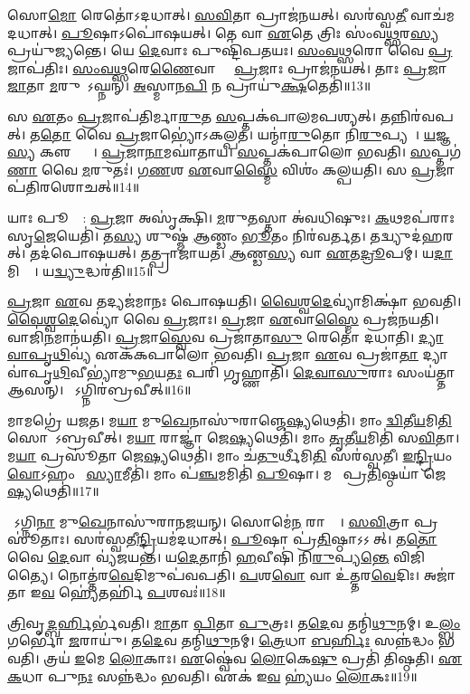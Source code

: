 𑌸𑍋\ul{𑌮𑍋} 𑌰𑍇𑌤𑍋॑\-𑌽𑌦𑌧𑌾𑌤𑍍।
\ul{𑌸}\ul{𑌵𑌿}𑌤𑌾 𑌪𑍍𑌰𑌾𑌜॑𑌨𑌯𑌤𑍍।
𑌸𑌰॑𑌸𑍍𑌵\ul{𑌤𑍀} 𑌵𑌾𑌚॑𑌮𑌦𑌧𑌾𑌤𑍍।
\ul{𑌪𑍂}𑌷𑌾\-𑌽𑌪𑍋॑𑌷𑌯𑌤𑍍।
𑌤𑍇 𑌵𑌾 \ul{𑌏}𑌤𑍇 𑌤𑍍𑌰𑌿𑌃 𑌸𑌂॑𑌵\ul{𑌥𑍍𑌸}𑌰\ul{𑌸𑍍𑌯} 𑌪𑍍𑌰𑌯𑍁॑𑌜𑍍𑌯𑌨𑍍𑌤𑍇।
𑌯𑍇 \ul{𑌦𑍇}𑌵𑌾𑌃 𑌪𑍁𑌷𑍍𑌟𑌿॑𑌪𑌤𑌯𑌃।
\ul{𑌸𑌂}\ul{𑌵}\ul{𑌥𑍍𑌸}𑌰𑍋 𑌵𑍈 \ul{𑌪𑍍𑌰}𑌜𑌾𑌪॑𑌤𑌿𑌃।
\ul{𑌸𑌂}\ul{𑌵}\ul{𑌥𑍍𑌸}𑌰𑍇\ul{𑌣𑍈}𑌵𑌾𑌸𑍍𑌮𑍈᳚ \ul{𑌪𑍍𑌰}𑌜𑌾𑌃 𑌪𑍍𑌰𑌾𑌜॑𑌨𑌯𑌤𑍍।
𑌤𑌾𑌃 \ul{𑌪𑍍𑌰}𑌜𑌾 \ul{𑌜𑌾}𑌤𑌾 \ul{𑌮}𑌰𑍁𑌤𑍋᳚\-𑌽𑌘𑍍𑌨𑌨𑍍।
\ul{𑌅}𑌸𑍍𑌮𑌾𑌨\ul{𑌪𑌿} 𑌨 𑌪𑍍𑌰𑌾𑌯𑍁॑\ul{𑌕𑍍𑌷}𑌤𑍇𑌤𑌿॑॥13॥

𑌸 \ul{𑌏}𑌤𑌂 \ul{𑌪𑍍𑌰}𑌜𑌾𑌪॑𑌤𑌿𑌰𑍍𑌮𑌾\ul{𑌰𑍁}𑌤 \ul{𑌸}𑌪𑍍𑌤𑌕॑𑌪𑌾𑌲𑌮𑌪𑌶𑍍𑌯𑌤𑍍।
𑌤𑌨𑍍𑌨𑌿𑌰॑𑌵𑌪𑌤𑍍।
𑌤\ul{𑌤𑍋} 𑌵𑍈 \ul{𑌪𑍍𑌰}𑌜𑌾𑌭𑍍𑌯𑍋॑\-𑌽𑌕𑌲𑍍𑌪𑌤।
𑌯𑌨𑍍𑌮𑌾॑\ul{𑌰𑍁}𑌤𑍋 𑌨𑌿॑\ul{𑌰𑍁}𑌪𑍍𑌯𑌤𑍇᳚।
\ul{𑌯}𑌜𑍍𑌞\ul{𑌸𑍍𑌯} 𑌕𑍢𑌪𑍍𑌤𑍍𑌯𑍈᳚।
\ul{𑌪𑍍𑌰}𑌜𑌾\ul{𑌨𑌾}𑌮𑌘𑌾॑𑌤𑌾𑌯।
\ul{𑌸}𑌪𑍍𑌤𑌕॑𑌪𑌾𑌲𑍋 𑌭𑌵𑌤𑌿।
\ul{𑌸}𑌪𑍍𑌤𑌗॑\ul{𑌣𑌾} 𑌵𑍈 \ul{𑌮}𑌰𑍁𑌤𑌃॑।
\ul{𑌗}\ul{𑌣}𑌶 \ul{𑌏}𑌵𑌾\ul{𑌸𑍍𑌮𑍈} 𑌵𑌿𑌶𑌂॑ 𑌕𑌲𑍍𑌪𑌯𑌤𑌿।
𑌸 \ul{𑌪𑍍𑌰}𑌜𑌾𑌪॑𑌤𑌿𑌰𑌶𑍋𑌚𑌤𑍍॥14॥

𑌯𑌾𑌃 𑌪𑍂𑌰𑍍𑌵𑌾᳚: \ul{𑌪𑍍𑌰}𑌜𑌾 𑌅𑌸𑍃॑𑌕𑍍𑌷𑌿।
\ul{𑌮}𑌰𑍁\ul{𑌤}𑌸𑍍𑌤𑌾 𑌅॑𑌵𑌧𑌿𑌷𑍁𑌃।
\ul{𑌕}𑌥𑌮𑌪॑𑌰𑌾𑌃 𑌸𑍃\ul{𑌜𑍇}𑌯𑍇𑌤𑌿॑।
𑌤\ul{𑌸𑍍𑌯} 𑌶𑍁𑌷𑍍𑌮॑ \ul{𑌆}𑌣𑍍𑌡𑌂 \ul{𑌭𑍂}𑌤𑌂 𑌨𑌿𑌰॑𑌵𑌰𑍍𑌤𑌤।
𑌤𑌦𑍍𑌵𑍍𑌯𑍁𑌦॑𑌹𑌰𑌤𑍍।
𑌤𑌦॑𑌪𑍋𑌷𑌯𑌤𑍍।
𑌤𑌤𑍍𑌪𑍍𑌰𑌾𑌜𑌾॑𑌯𑌤।
\ul{𑌆}𑌣𑍍𑌡\ul{𑌸𑍍𑌯} 𑌵𑌾 \ul{𑌏}𑌤\ul{𑌦𑍍𑌰𑍂}𑌪𑌮𑍍।
𑌯\ul{𑌦𑌾}𑌮𑌿𑌕𑍍𑌷𑌾᳚।
𑌯\ul{𑌦𑍍𑌵𑍍𑌯𑍁}𑌦𑍍𑌧𑌰॑𑌤𑌿॥15॥

\ul{𑌪𑍍𑌰}𑌜𑌾 \ul{𑌏}𑌵 𑌤𑌦𑍍𑌯𑌜॑𑌮𑌾𑌨𑌃 𑌪𑍋𑌷𑌯𑌤𑌿।
\ul{𑌵𑍈}\ul{𑌶𑍍𑌵}\ul{𑌦𑍇}𑌵𑍍𑌯𑌾॑𑌮𑌿𑌕𑍍𑌷𑌾॑ 𑌭𑌵𑌤𑌿।
\ul{𑌵𑍈}\ul{𑌶𑍍𑌵}\ul{𑌦𑍇}𑌵𑍍𑌯𑍋॑ 𑌵𑍈 \ul{𑌪𑍍𑌰}𑌜𑌾𑌃।
\ul{𑌪𑍍𑌰}𑌜𑌾 \ul{𑌏}𑌵𑌾\ul{𑌸𑍍𑌮𑍈} 𑌪𑍍𑌰𑌜॑𑌨𑌯𑌤𑌿।
𑌵𑌾𑌜𑌿॑\ul{𑌨}𑌮𑌾𑌨॑𑌯𑌤𑌿।
\ul{𑌪𑍍𑌰}𑌜𑌾\ul{𑌸𑍍𑌵𑍇}𑌵 𑌪𑍍𑌰𑌜𑌾॑𑌤𑌾\ul{𑌸𑍁} 𑌰𑍇𑌤𑍋॑ 𑌦𑌧𑌾𑌤𑌿।
\ul{𑌦𑍍𑌯𑌾}\ul{𑌵𑌾}\ul{𑌪𑍃}\ul{𑌥𑌿}𑌵𑍍𑌯॑ 𑌏𑌕॑𑌕𑌪𑌾𑌲𑍋 𑌭𑌵𑌤𑌿।
\ul{𑌪𑍍𑌰}𑌜𑌾 \ul{𑌏}𑌵 𑌪𑍍𑌰𑌜𑌾॑\ul{𑌤𑌾} 𑌦𑍍𑌯𑌾𑌵𑌾॑𑌪𑍃\ul{𑌥𑌿}𑌵𑍀𑌭𑍍𑌯𑌾॑𑌮𑍁\ul{𑌭}𑌯\ul{𑌤𑌃} 𑌪𑌰𑌿॑ 𑌗𑍃𑌹𑍍𑌣𑌾𑌤𑌿।
\ul{𑌦𑍇}\ul{𑌵𑌾}\ul{𑌸𑍁}𑌰𑌾𑌃 𑌸𑌂𑌯॑𑌤𑍍𑌤𑌾 𑌆𑌸𑌨𑍍।
𑌸𑍋᳚𑌽𑌗𑍍𑌨𑌿𑌰॑𑌬𑍍𑌰𑌵𑍀𑌤𑍍॥16॥

𑌮𑌾𑌮𑌗𑍍𑌰𑍇॑ 𑌯𑌜𑌤।
𑌮\ul{𑌯𑌾} 𑌮𑍁\ul{𑌖𑍇}𑌨𑌾𑌸𑍁॑𑌰𑌾𑌞𑍍𑌜𑍇\ul{𑌷𑍍𑌯}𑌥𑍇𑌤𑌿॑।
𑌮𑌾𑌂 \ul{𑌦𑍍𑌵𑌿}𑌤𑍀\ul{𑌯}𑌮𑌿\ul{𑌤𑌿} 𑌸𑍋𑌮𑍋᳚\-𑌽𑌬𑍍𑌰𑌵𑍀𑌤𑍍।
𑌮\ul{𑌯𑌾} 𑌰𑌾𑌜𑍍𑌞𑌾॑ 𑌜𑍇\ul{𑌷𑍍𑌯}𑌥𑍇𑌤𑌿॑।
𑌮𑌾𑌂 \ul{𑌤𑍃}𑌤𑍀\ul{𑌯}𑌮𑌿𑌤𑌿॑ 𑌸\ul{𑌵𑌿}𑌤𑌾।
𑌮\ul{𑌯𑌾} 𑌪𑍍𑌰𑌸𑍂॑𑌤𑌾 𑌜𑍇\ul{𑌷𑍍𑌯}𑌥𑍇𑌤𑌿॑।
𑌮𑌾𑌂 𑌚॑\ul{𑌤𑍁}𑌰𑍍𑌥𑍀𑌮𑌿\ul{𑌤𑌿} 𑌸𑌰॑𑌸𑍍𑌵𑌤𑍀।
\ul{𑌇}\ul{𑌨𑍍𑌦𑍍𑌰𑌿}𑌯𑌂 \ul{𑌵𑍋}𑌽𑌹𑌂 𑌧𑌾᳚\ul{𑌸𑍍𑌯𑌾}𑌮𑍀𑌤𑌿॑।
𑌮𑌾𑌂 𑌪॑\ul{𑌞𑍍𑌚}𑌮𑌮𑌿𑌤𑌿॑ \ul{𑌪𑍂}𑌷𑌾।
𑌮𑌯𑌾᳚ 𑌪𑍍𑌰\ul{𑌤𑌿}𑌷𑍍𑌠𑌯𑌾॑ 𑌜𑍇\ul{𑌷𑍍𑌯}𑌥𑍇𑌤𑌿॑॥17॥

𑌤𑍇᳚𑌽𑌗𑍍𑌨𑌿\ul{𑌨𑌾} 𑌮𑍁\ul{𑌖𑍇}𑌨𑌾𑌸𑍁॑𑌰𑌾𑌨𑌜𑌯𑌨𑍍।
𑌸𑍋𑌮𑍇॑\ul{𑌨} 𑌰𑌾𑌜𑍍𑌞𑌾᳚।
\ul{𑌸}\ul{𑌵𑌿}𑌤𑍍𑌰𑌾 𑌪𑍍𑌰𑌸𑍂॑𑌤𑌾𑌃।
𑌸𑌰॑𑌸𑍍𑌵𑌤𑍀\ul{𑌨𑍍𑌦𑍍𑌰𑌿}𑌯𑌮॑𑌦𑌧𑌾𑌤𑍍।
\ul{𑌪𑍂}𑌷𑌾 𑌪𑍍𑌰॑\ul{𑌤𑌿}𑌷𑍍𑌠𑌾\-𑌽𑌽𑌸𑍀᳚𑌤𑍍।
𑌤\ul{𑌤𑍋} 𑌵𑍈 \ul{𑌦𑍇}𑌵𑌾 𑌵𑍍𑌯॑𑌜𑌯𑌨𑍍𑌤।
𑌯\ul{𑌦𑍇}𑌤𑌾𑌨𑌿॑ \ul{𑌹}𑌵𑍀𑌷𑌿॑ 𑌨𑌿\ul{𑌰𑍁}𑌪𑍍𑌯\ul{𑌨𑍍𑌤𑍇} 𑌵𑌿𑌜𑌿॑𑌤𑍍𑌯𑍈।
𑌨𑍋𑌤𑍍𑌤॑𑌰\ul{𑌵𑍇}𑌦𑌿𑌮𑍁𑌪॑𑌵𑌪𑌤𑌿।
\ul{𑌪}𑌶\ul{𑌵𑍋} 𑌵𑌾 𑌉॑𑌤𑍍𑌤𑌰\ul{𑌵𑍇}𑌦𑌿𑌃।
𑌅𑌜𑌾॑𑌤𑌾 𑌇\ul{𑌵} 𑌹𑍍𑌯𑍇॑𑌤𑌰𑍍\mbox{}𑌹𑌿॑ \ul{𑌪}𑌶𑌵𑌃॑॥18॥\anuvakamend[\ul{𑌐}𑌦𑌿𑌤𑍍𑌯॑𑌶𑍋𑌚\ul{𑌦𑍍𑌵𑍍𑌯𑍁}𑌦𑍍𑌧𑌰॑𑌤𑍍𑌯𑌬𑍍𑌰𑌵𑍀𑌤𑍍𑌪𑍍𑌰\ul{𑌤𑌿}𑌷𑍍𑌠𑌯𑌾॑ 𑌜𑍇\ul{𑌷𑍍𑌯}𑌥𑍇\ul{𑌤𑍍𑌯𑍇}𑌤𑌰𑍍\mbox{}𑌹𑌿॑ \ul{𑌪}𑌶𑌵𑌃॑]

\ul{𑌤𑍍𑌰𑌿}𑌵𑍃\ul{𑌦𑍍𑌬}\ul{𑌰𑍍}𑌹𑌿𑌰𑍍𑌭॑𑌵𑌤𑌿।
\ul{𑌮𑌾}𑌤𑌾 \ul{𑌪𑌿}𑌤𑌾 \ul{𑌪𑍁}𑌤𑍍𑌰𑌃।
𑌤\ul{𑌦𑍇}𑌵 𑌤𑌨𑍍𑌮𑌿॑\ul{𑌥𑍁}𑌨𑌮𑍍।
𑌉\ul{𑌲𑍍𑌬𑌂} 𑌗𑌰𑍍𑌭𑍋॑ \ul{𑌜}𑌰𑌾𑌯𑍁॑।
𑌤\ul{𑌦𑍇}𑌵 𑌤𑌨𑍍𑌮𑌿॑\ul{𑌥𑍁}𑌨𑌮𑍍।
\ul{𑌤𑍍𑌰𑍇}𑌧𑌾 \ul{𑌬}\ul{𑌰𑍍}𑌹𑌿𑌃 𑌸𑌨𑍍𑌨॑𑌦𑍍𑌧𑌂 𑌭𑌵𑌤𑌿।
𑌤𑍍𑌰𑌯॑ \ul{𑌇}𑌮𑍇 \ul{𑌲𑍋}𑌕𑌾𑌃।
\ul{𑌏}𑌷𑍍𑌵𑍇॑𑌵 \ul{𑌲𑍋}𑌕𑍇\ul{𑌷𑍁} 𑌪𑍍𑌰𑌤𑌿॑ 𑌤𑌿𑌷𑍍𑌠𑌤𑌿।
\ul{𑌏}\ul{𑌕}𑌧𑌾 𑌪𑍁\ul{𑌨𑌃} 𑌸𑌨𑍍𑌨॑𑌦𑍍𑌧𑌂 𑌭𑌵𑌤𑌿।
𑌏𑌕॑ 𑌇\ul{𑌵} 𑌹𑍍𑌯॑𑌯𑌂 \ul{𑌲𑍋}𑌕𑌃॥19॥

